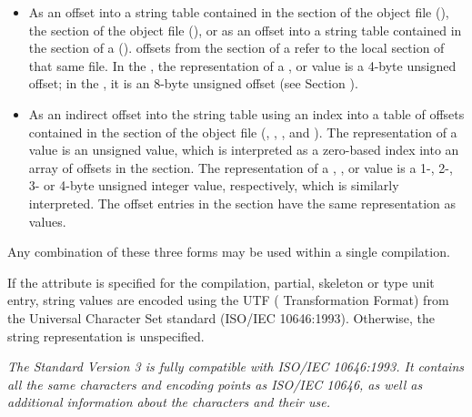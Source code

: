 \begin{itemize}
\begin{itemize}
\item As an 
offset into a string table contained in
the \dotdebugstr{} section of the object file (\DWFORMstrpTARG), 
the \dotdebuglinestr{} section of the object file (\DWFORMlinestrpTARG),
or as an offset into a string table contained in the
\dotdebugstr{} section of a  
(\DWFORMstrpsupTARG).  \DWFORMstrpsupNAME{} offsets from the \dotdebuginfo{}  
section of a 
refer to the local \dotdebugstr{} section of that same file.
In the \thirtytwobitdwarfformat, the representation of a 
\DWFORMstrpNAME{}, \DWFORMlinestrpNAME{} or \DWFORMstrpsupNAME{}
value is a 4-byte unsigned offset; in the \sixtyfourbitdwarfformat,
it is an 8-byte unsigned offset 
(see Section ).

\item As an indirect offset into the string table using an 
index into a table of offsets contained in the 
\dotdebugstroffsets{} section of the object file 
(\DWFORMstrxTARG, \DWFORMstrxoneTARG, \DWFORMstrxtwoTARG, 
\DWFORMstrxthreeTARG{} and \DWFORMstrxfourTARG).
The representation of a \DWFORMstrxNAME{} value is an unsigned 
 value, which is interpreted as a zero-based 
index into an array of offsets in the \dotdebugstroffsets{} section.
The representation of a \DWFORMstrxoneNAME, \DWFORMstrxtwoNAME, 
\DWFORMstrxthreeNAME{} or \DWFORMstrxfourNAME{} value is a 
1-, 2-, 3- or 4-byte unsigned integer value, respectively,
which is similarly interpreted.
The offset entries in the \dotdebugstroffsets{} section have the 
same representation as \DWFORMstrp{} values.
\end{itemize}
Any combination of these three forms may be used within a single compilation.

If the \DWATuseUTFeight{}
 attribute is specified for the
compilation, partial, skeleton or type unit entry, string values are encoded using the
UTF ( Transformation Format) from the Universal
Character Set standard (ISO/IEC 10646:1993).
Otherwise, the string representation is unspecified.

\textit{The  Standard Version 3 is fully compatible with
ISO/IEC 10646:1993. 
It contains all the same characters
and encoding points as ISO/IEC 10646, as well as additional
information about the characters and their use.}


\end{itemize}
